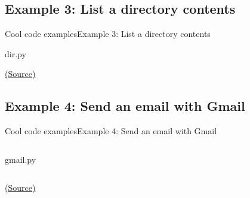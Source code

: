\documentclass[10pt,compress]{beamer} %
\begin{document}
\subsection{Example 3: List a directory contents}
\begin{frame}{Cool code examples}{Example 3: List a directory contents}
		\vspace{-0.2cm}
		\begin{block}{dir.py}
		\vspace{-0.2cm}
		
		\vspace{-0.2cm}
		\end{block}

		\vspace{-0.2cm}
	\centering \tiny{\href{http://www.pythonforbeginners.com/code-snippets-source-code/having-fun-with-os-walk-in-python/}{(Source)}}
\end{frame}

\subsection{Example 4: Send an email with Gmail}
\begin{frame}{Cool code examples}{Example 4: Send an email with Gmail}
	\begin{columns}
		\vspace{-0.2cm}
		\begin{block}{gmail.py}
		\vspace{-0.2cm}
		
		\end{block}
	\end{columns}

	\centering \tiny{\href{http://www.pythonforbeginners.com/code-snippets-source-code/using-python-to-send-email/}{(Source)}}
\end{frame}
\end{document}
